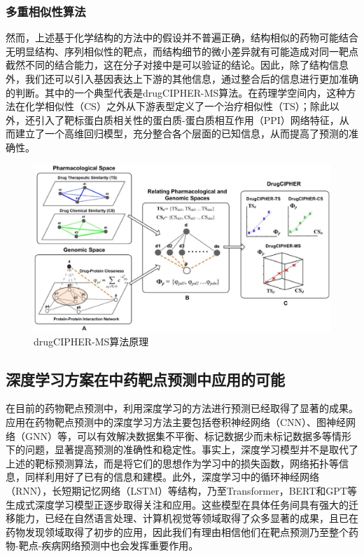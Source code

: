 \subsubsection{多重相似性算法}

然而，上述基于化学结构的方法中的假设并不普遍正确，结构相似的药物可能结合无明显结构、序列相似性的靶点，而结构细节的微小差异就有可能造成对同一靶点截然不同的结合能力，这在分子对接中是可以验证的结论。因此，除了结构信息外，我们还可以引入基因表达上下游的其他信息，通过整合后的信息进行更加准确的判断。其中的一个典型代表是drugCIPHER-MS算法。在药理学空间内，这种方法在化学相似性（CS）之外从下游表型定义了一个治疗相似性（TS）；除此以外，还引入了靶标蛋白质相关性的蛋白质-蛋白质相互作用（PPI）网络特征，从而建立了一个高维回归模型，充分整合各个层面的已知信息，从而提高了预测的准确性。\cite{Zhao_Li_2010}

\begin{figure}[H]
  \centering
  \includegraphics[width=\linewidth]{figures/drugCIPHER-MS.png}
  \caption{drugCIPHER-MS算法原理\cite{Zhao_Li_2010}}
  \label{fig:drugCIPHER-MS}
\end{figure}

\subsection{深度学习方案在中药靶点预测中应用的可能}

在目前的药物靶点预测中，利用深度学习的方法进行预测已经取得了显著的成果。应用在药物靶点预测中的深度学习方法主要包括卷积神经网络（CNN）、图神经网络（GNN）等\cite{Tsubaki_Tomii_Sese_2019}，可以有效解决数据集不平衡、标记数据少而未标记数据多等情形下的问题，显著提高预测的准确性和稳定性。事实上，深度学习模型并不是取代了上述的靶标预测算法，而是将它们的思想作为学习中的损失函数，网络拓扑等信息，同样利用好了已有的信息和建模。此外，深度学习中的循环神经网络（RNN），长短期记忆网络（LSTM）等结构，乃至Transformer，BERT和GPT等生成式深度学习模型正逐步取得关注和应用。这些模型在具体任务间具有强大的迁移能力，已经在自然语言处理、计算机视觉等领域取得了众多显著的成果，且已在药物发现领域取得了初步的应用，因此我们有理由相信他们在靶点预测乃至整个药物-靶点-疾病网络预测中也会发挥重要作用。\cite{Haroon_C.a._A.s._2023}

